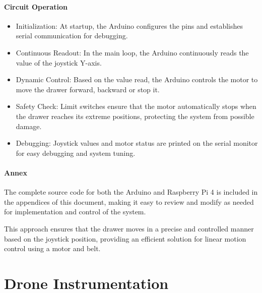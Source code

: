     
    \paragraph{\textbf{Circuit Operation}
    }
    \begin{itemize}
        \item Initialization: At startup, the Arduino configures the pins and establishes serial communication for debugging.
    \item Continuous Readout: In the main loop, the Arduino continuously reads the value of the joystick Y-axis.
    \item Dynamic Control: Based on the value read, the Arduino controls the motor to move the drawer forward, backward or stop it.
    \item Safety Check: Limit switches ensure that the motor automatically stops when the drawer reaches its extreme positions, protecting the system from possible damage.
    \item Debugging: Joystick values and motor status are printed on the serial monitor for easy debugging and system tuning.
    \end{itemize}
    
    \paragraph{\textbf{Annex}
    }
    The complete source code for both the Arduino and Raspberry Pi 4 is included in the appendices of this document, making it easy to review and modify as needed for implementation and control of the system.
    
    This approach ensures that the drawer moves in a precise and controlled manner based on the joystick position, providing an efficient solution for linear motion control using a motor and belt.

    
\section{Drone Instrumentation}

